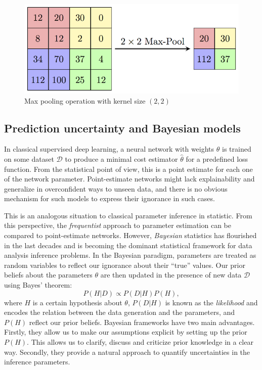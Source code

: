 \begin{figure}
    \centering
    \includegraphics[width=0.6\linewidth]{img/ML/MaxpoolSample2.png}
    \caption{Max pooling operation with kernel size $(2,2)$}
    \label{fig:ML max pool}
\end{figure}

\subsection{Prediction uncertainty and Bayesian models}
In classical supervised deep learning, a neural network with weights $\theta$ is trained on some dataset $\mathcal{D}$ to produce a minimal cost estimator $\hat{\theta}$ for a predefined loss function. From the statistical point of view, this is a point estimate for each one of the network parameter. Point-estimate networks might lack explainability and generalize in overconfident ways to unseen data, and there is no obvious mechanism for such models to express their ignorance in such cases.


This is an analogous situation to classical parameter inference in statistic. From this perspective, the \emph{frequentist} approach to parameter estimation can be compared to point-estimate networks.
However, \emph{Bayesian} statistics \cite{bayesian_stat} has flourished in the last decades and is becoming the dominant statistical framework for data analysis inference problems. In the Bayesian paradigm, parameters are treated as random variables to reflect our ignorance about their ``true'' values. Our prior beliefs about the parameters $\theta$ are then updated in the presence of new data $\mathcal{D}$ using Bayes' theorem:
\begin{equation}\label{eq:Bayes theorem}
    P(H|D) \propto P(D|H)P(H),
\end{equation}
where $H$ is a certain hypothesis about $\theta$, $P(D|H)$ is known as the \emph{likelihood} and encodes the relation between the data generation and the parameters, and $P(H)$ reflect our prior beliefs. Bayesian frameworks have two main advantages. Firstly, they allow us to make our assumptions explicit by setting up the prior $P(H)$. This allows us to clarify, discuss and criticize prior knowledge in a clear way. Secondly, they provide a natural approach to quantify uncertainties in the inference parameters.


